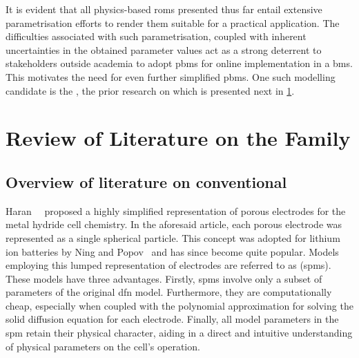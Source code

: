 


It  is evident  that all  physics-based  \glspl{rom} presented  thus far  entail
extensive  parametrisation  efforts to  render  them  suitable for  a  practical
application. The difficulties associated with such parametrisation, coupled with
inherent  uncertainties  in  the  obtained  parameter values  act  as  a  strong
deterrent  to stakeholders  outside  academia to  adopt  \glspl{pbm} for  online
implementation  in  a  \gls{bms}.  This  motivates the  need  for  even  further
simplified \glspl{pbm}. One such modelling  candidate is the , the
prior research on which is presented next in \cref{sec:spmlittreview}.


\section{Review of Literature on the  Family}\label{sec:spmlittreview}

\subsection{Overview of literature on conventional }

Haran~\etal{}~\cite{Haran1998}  proposed a  highly simplified  representation of
porous  electrodes  for the  metal  hydride  cell  chemistry. In  the  aforesaid
article,  each   porous  electrode  was   represented  as  a   single  spherical
particle.  This concept  was  adopted  for lithium  ion  batteries  by Ning  and
Popov~\cite{Ning2004} and has since become  quite popular. Models employing this
lumped  representation  of  electrodes  are referred  to  as  
(\glspl{spm}).  These models  have  three advantages.  Firstly,  \glspl{spm}
involve  only a  subset  of  parameters  of  the   original  \gls{dfn}  model.
Furthermore,  they are  computationally cheap, especially when coupled with the 
polynomial approximation for solving the solid diffusion  equation for  each
electrode.  Finally, all  model parameters  in the \gls{spm}  retain their 
physical character,  aiding in  a direct  and intuitive understanding of
physical parameters on the cell's operation.


